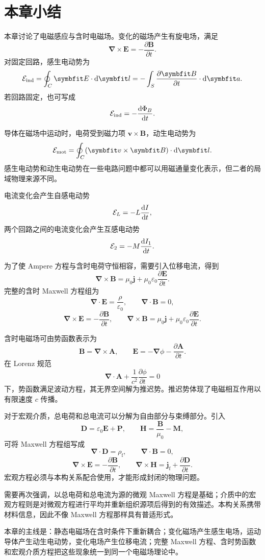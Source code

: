 \section{本章小结}

本章讨论了电磁感应与含时电磁场。变化的磁场产生有旋电场，满足
\[
\bm{\nabla}\times\bm{E}
=
-\frac{\partial\bm{B}}{\partial t}.
\]
对固定回路，感生电动势为
\[
\mathcal{E}_{\mathrm{ind}}
=
\oint_{C}\bm{E}\cdot\dif\bm{l}
=
-\int_{S}
\frac{\partial\bm{B}}{\partial t}
\cdot\dif\bm{a}.
\]
若回路固定，也可写成
\[
\mathcal{E}_{\mathrm{ind}}
=
-\frac{\mathop{}\!\mathrm{d}\Phi_{B}}{\mathop{}\!\mathrm{d} t}.
\]

导体在磁场中运动时，电荷受到磁力项 $\bm{v}\times\bm{B}$，动生电动势为
\[
\mathcal{E}_{\mathrm{mot}}
=
\oint_{C}
(\bm{v}\times\bm{B})\cdot\dif\bm{l}.
\]
感生电动势和动生电动势在一些电路问题中都可以用磁通量变化表示，但二者的局域物理来源不同。

电流变化会产生自感电动势
\[
\mathcal{E}_{L}
=
-L\frac{\mathop{}\!\mathrm{d} I}{\mathop{}\!\mathrm{d} t},
\]
两个回路之间的电流变化会产生互感电动势
\[
\mathcal{E}_{2}
=
-M\frac{\mathop{}\!\mathrm{d} I_{1}}{\mathop{}\!\mathrm{d} t}.
\]

为了使 Ampere 方程与含时电荷守恒相容，需要引入位移电流，得到
\[
\bm{\nabla}\times\bm{B}
=
\mu_{0}\bm{j}
+
\mu_{0}\varepsilon_{0}
\frac{\partial\bm{E}}{\partial t}.
\]
完整的含时 Maxwell 方程组为
\[
\bm{\nabla}\cdot\bm{E}
=
\frac{\rho}{\varepsilon_{0}},
\qquad
\bm{\nabla}\cdot\bm{B}=0,
\]
\[
\bm{\nabla}\times\bm{E}
=
-\frac{\partial\bm{B}}{\partial t},
\qquad
\bm{\nabla}\times\bm{B}
=
\mu_{0}\bm{j}
+
\mu_{0}\varepsilon_{0}
\frac{\partial\bm{E}}{\partial t}.
\]

含时电磁场可由势函数表示为
\[
\bm{B}
=
\bm{\nabla}\times\bm{A},
\qquad
\bm{E}
=
-\bm{\nabla}\phi
-
\frac{\partial\bm{A}}{\partial t}.
\]
在 Lorenz 规范
\[
\bm{\nabla}\cdot\bm{A}
+
\frac{1}{c^{2}}
\frac{\partial\phi}{\partial t}
=
0
\]
下，势函数满足波动方程，其无界空间解为推迟势。推迟势体现了电磁相互作用以有限速度 $c$ 传播。

对于宏观介质，总电荷和总电流可以分解为自由部分与束缚部分。引入
\[
\bm{D}
=
\varepsilon_{0}\bm{E}
+
\bm{P},
\qquad
\bm{H}
=
\frac{\bm{B}}{\mu_{0}}
-
\bm{M},
\]
可将 Maxwell 方程组写成
\[
\bm{\nabla}\cdot\bm{D}
=
\rho_{\mathrm{f}},
\qquad
\bm{\nabla}\cdot\bm{B}=0,
\]
\[
\bm{\nabla}\times\bm{E}
=
-\frac{\partial\bm{B}}{\partial t},
\qquad
\bm{\nabla}\times\bm{H}
=
\bm{j}_{\mathrm{f}}
+
\frac{\partial\bm{D}}{\partial t}.
\]
宏观方程必须与本构关系配合使用，才能形成封闭的物理问题。

需要再次强调，以总电荷和总电流为源的微观 Maxwell 方程是基础；介质中的宏观方程则是对微观方程进行平均并重新组织源项后得到的有效描述。本构关系携带材料信息，因此不像 Maxwell 方程那样具有普适形式。

本章的主线是：静态电磁场在含时条件下重新耦合；变化磁场产生感生电场，运动导体产生动生电动势，变化电场产生位移电流；完整 Maxwell 方程、含时势函数和宏观介质方程把这些现象统一到同一个电磁场理论中。
